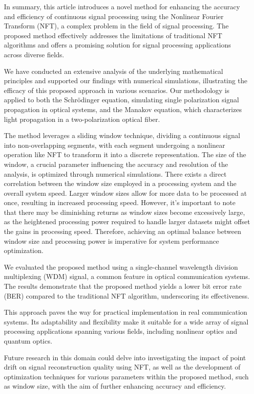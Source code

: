 In summary, this article introduces a novel method for enhancing the accuracy and efficiency of continuous signal processing using the Nonlinear Fourier Transform (NFT), a complex problem in the field of signal processing. The proposed method effectively addresses the limitations of traditional NFT algorithms and offers a promising solution for signal processing applications across diverse fields.

We have conducted an extensive analysis of the underlying mathematical principles and supported our findings with numerical simulations, illustrating the efficacy of this proposed approach in various scenarios. Our methodology is applied to both the Schr\"odinger equation, simulating single polarization signal propagation in optical systems, and the Manakov equation, which characterizes light propagation in a two-polarization optical fiber.

The method leverages a sliding window technique, dividing a continuous signal into non-overlapping segments, with each segment undergoing a nonlinear operation like NFT to transform it into a discrete representation. The size of the window, a crucial parameter influencing the accuracy and resolution of the analysis, is optimized through numerical simulations. There exists a direct correlation between the window size employed in a processing system and the overall system speed. Larger window sizes allow for more data to be processed at once, resulting in increased processing speed. However, it's important to note that there may be diminishing returns as window sizes become excessively large, as the heightened processing power required to handle larger datasets might offset the gains in processing speed. Therefore, achieving an optimal balance between window size and processing power is imperative for system performance optimization.

We evaluated the proposed method using a single-channel wavelength division multiplexing (WDM) signal, a common feature in optical communication systems. The results demonstrate that the proposed method yields a lower bit error rate (BER) compared to the traditional NFT algorithm, underscoring its effectiveness.

This approach paves the way for practical implementation in real communication systems. Its adaptability and flexibility make it suitable for a wide array of signal processing applications spanning various fields, including nonlinear optics and quantum optics.

Future research in this domain could delve into investigating the impact of point drift on signal reconstruction quality using NFT, as well as the development of optimization techniques for various parameters within the proposed method, such as window size, with the aim of further enhancing accuracy and efficiency.